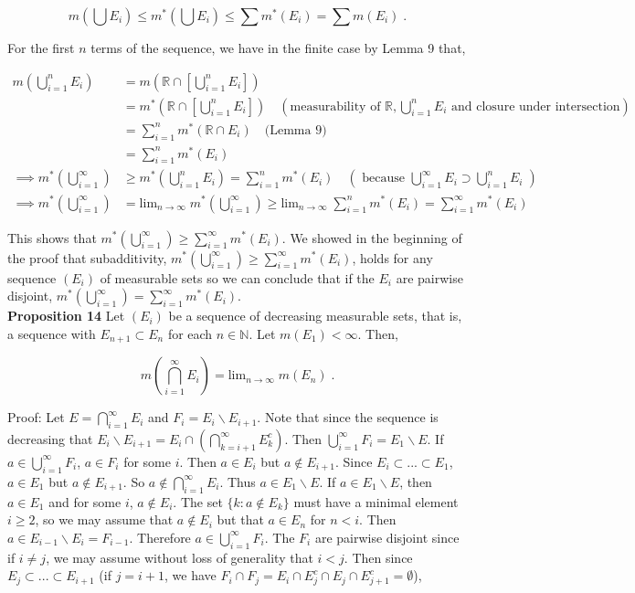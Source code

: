 \documentclass[a4paper]{article}
\begin{document}
$$m\left(\bigcup E_i\right) \leq m^*\left(\bigcup E_i\right) \leq \sum m^*(E_i) = \sum m(E_i) \;.$$

For the first $n$ terms of the sequence, we have in the finite case by Lemma 9 that,

\begin{align*}
m\left(\bigcup_{i=1}^n E_i \right) &=  m\left( \mathbb{R} \cap \left[ \bigcup_{i=1}^n E_i \right]\right) \\
&= m^*\left(\mathbb{R} \cap \left[\bigcup_{i=1}^n E_i \right]\right) \quad (\text{measurability of } \mathbb{R}, \bigcup_{i=1}^n E_i \text{ and closure under intersection})\\
&=\sum_{i=1}^n m^*(\mathbb{R}\cap E_i) \quad \text{(Lemma 9)}\\
&=\sum_{i=1}^n m^*(E_i)\\
\implies m^*\left(\bigcup_{i=1}^\infty\right) &\geq m^*\left(\bigcup_{i=1}^n E_i\right) = \sum_{i=1}^n m^*(E_i) \quad (\text{ because }\bigcup_{i=1}^\infty E_i \supset \bigcup_{i=1}^n E_i \;)\\
\implies m^*\left(\bigcup_{i=1}^\infty\right) &= \text{lim}_{n\rightarrow \infty} \; m^*\left(\bigcup_{i=1}^\infty\right) \geq \text{lim}_{n\rightarrow \infty} \; \sum_{i=1}^n m^*(E_i) = \sum_{i=1}^\infty m^*(E_i)
\end{align*}

This shows that $m^*\left(\bigcup_{i=1}^\infty\right) \geq  \sum_{i=1}^\infty m^*(E_i)$. We showed in the beginning of the proof that subadditivity, $m^*\left(\bigcup_{i=1}^\infty\right) \geq  \sum_{i=1}^\infty m^*(E_i)$, holds for any sequence $(E_i)$ of measurable sets so we can conclude that if the $E_i$ are pairwise disjoint, $m^*\left(\bigcup_{i=1}^\infty\right) =  \sum_{i=1}^\infty m^*(E_i)$.\\

{\bf Proposition 14} Let $(E_i)$ be a sequence of decreasing measurable sets, that is, a sequence with $E_{n+1} \subset E_n$ for each $n \in \mathbb{N}$. Let $m(E_1)<\infty$. Then,

$$m\left(\bigcap_{i=1}^\infty E_i \right) = \text{lim}_{n\rightarrow \infty} \; m(E_n) \;.$$

Proof: Let $E = \bigcap_{i=1}^\infty E_i$ and $F_i = E_i \backslash E_{i+1}$. Note that since the sequence is decreasing that $E_i \backslash E_{i+1} = E_i \cap (\bigcap_{k=i+1}^\infty E_k^c )$. Then $\bigcup_{i=1}^\infty F_i = E_1 \backslash E$. If $a \in \bigcup_{i=1}^\infty F_i$, $a \in F_i$ for some $i$. Then $a \in E_i$ but $a \not\in E_{i+1}$. Since $E_i \subset... \subset E_1$, $a \in E_1$ but $a \not\in E_{i+1}$. So $a \not\in \bigcap_{i=1}^\infty E_i$. Thus $a \in E_1 \backslash E$. If $a \in E_1 \backslash E$, then $a \in E_1$ and for some $i$, $a \not \in E_i$. The set $\{k : a \not\in E_k\}$ must have a minimal element $i \geq 2$, so we may assume that $a \not\in E_i$ but that $a \in E_n$ for $n < i$. Then $a \in E_{i-1} \backslash E_{i} = F_{i-1}$. Therefore $a \in \bigcup_{i=1}^\infty F_i$. The $F_i$ are pairwise disjoint since if $i\neq j$, we may assume without loss of generality that $i<j$. Then since $E_j \subset ... \subset E_{i+1}$ (if $j = i+1$, we have $F_i \cap F_j = E_i \cap E_j^c \cap E_j \cap E_{j+1}^c = \emptyset$),
\end{document}
